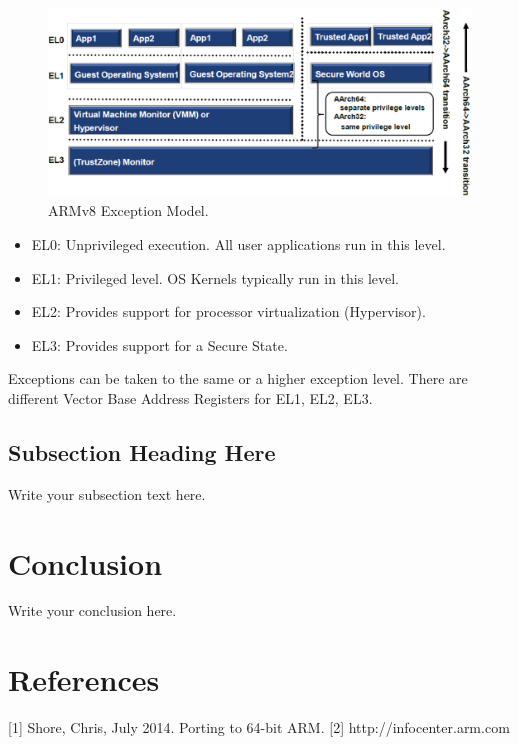 \documentclass[journal]{IEEEtran}
\begin{document}
\begin{figure}[b!]
	\centering
    \includegraphics[width=7.0in]{./figures/exceptionLevels.eps}
    \caption{ARMv8 Exception Model.}
    \label{fig:Execpfig}
\end{figure}



\begin{itemize}
	\item EL0: Unprivileged execution. All user applications run in this level.
	\item EL1: Privileged level. OS Kernels typically run in this level.
	\item EL2: Provides support for processor virtualization (Hypervisor).
	\item EL3: Provides support for a Secure State.
\end{itemize}
Exceptions can be taken to the same or a higher exception level. There are different Vector Base Address Registers for EL1, EL2, EL3.


\subsection{Subsection Heading Here}
Write your subsection text here.

\section{Conclusion}
Write your conclusion here.

\section{References}
[1] Shore, Chris, July 2014. Porting to 64-bit ARM.
[2] http://infocenter.arm.com 
\end{document}
